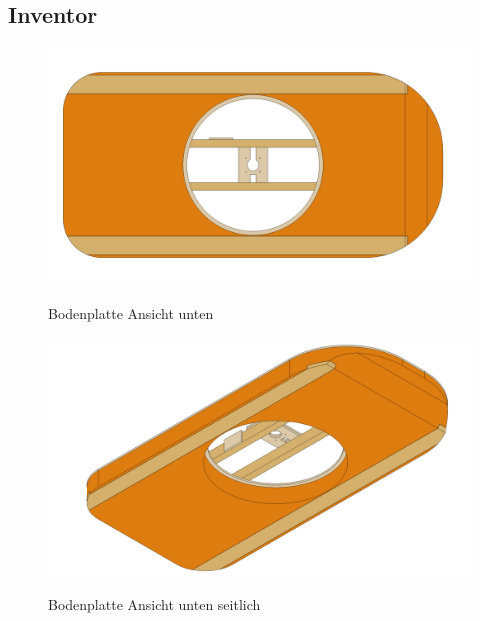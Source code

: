 \clearpage
\subsection{Inventor}
\begin{figure}[H]
    \centering
    \includegraphics[width=.92\textwidth]{../Inventor/Bodenplatte/png/Bodenplatte_unten.png}
    \label{fig:konst:bodenplatte:inventor1}
    \caption{Bodenplatte Ansicht unten}
\end{figure}
\begin{figure}[H]
    \centering
    \includegraphics[width=.92\textwidth]{../Inventor/Bodenplatte/png/Bodenplatte_seitlich.png}
    \label{fig:konst:bodenplatte:inventor2}
    \caption{Bodenplatte Ansicht unten seitlich}
\end{figure}

